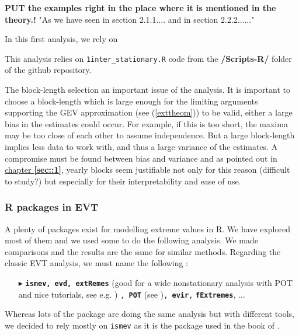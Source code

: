 
\textbf{PUT the examples right in the place where it is mentioned in the theory.!} 
"As we have seen in section 2.1.1.... and in section 2.2.2......"

In this first analysis, we rely on 

This analysis relies on \texttt{1inter\_stationary.R} code from the \textbf{/Scripts-R/} folder of the github repository.



The block-length selection an important issue of the analysis. It is important to choose a block-length which is large enough for the limiting arguments supporting the GEV approximation (see (\ref{exttheom})) to be valid, either a large bias in the estimates could occur. For example, if this is too short, the maxima may be too close of each other to assume independence. But a large block-length implies less data to work with, and thus a large variance of the estimates. A compromise must be found between bias and variance and as pointed out in \hyperref[sec::1]{chapter \textbf{\ref{sec::1}}}, yearly blocks seem justifiable not only for this reason (difficult to study?) but especially for their interpretability and ease of use.

\subsubsection*{R packages in EVT}

A plenty of packages exist for modelling extreme values in R. We have explored most of them and we used some to do the following analysis. We made comparisons and the results are the same for similar methods. Regarding the classic EVT analysis, we must name the following : 
\vspace*{-.2cm}
\begin{itemize}
\item[$\blacktriangleright$] \textbf{\texttt{ismev, evd, extRemes}} (good for a wide nonstationary analysis with POT and nice tutorials, see e.g. \citet{gilleland_extremes_2016})  \texttt{, \textbf{POT}} (see \citet{ribatet_users_2006})\texttt{, \textbf{evir},} \texttt{\textbf{fExtremes}}, $\dots$
\end{itemize}

Whereas lots of the package are doing the same analysis but with different tools, we decided to rely mostly on \texttt{ismev} as it is the package used in the book of \citet{coles_introduction_2001}.

